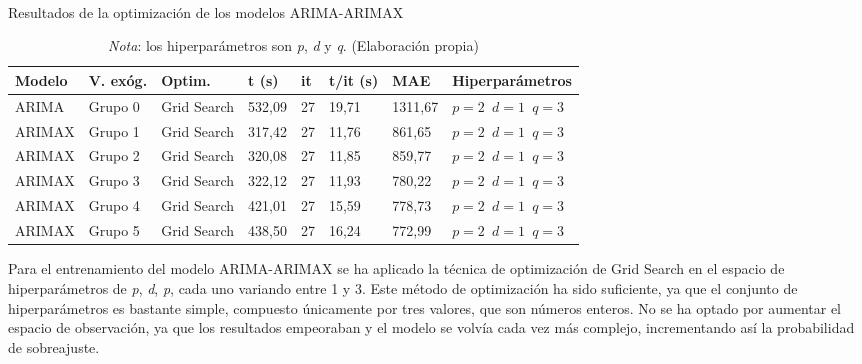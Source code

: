 \documentclass[12pt,a4paper]{report}
\begin{document}
\begin{table}[H]
\centering
\caption{\\ Resultados de la optimización de los modelos ARIMA-ARIMAX}
\scriptsize
\begin{tabular}{m{1cm} m{1.2cm} m{1.2cm} m{1cm} m{1cm} m{1.2cm} m{1.2cm} m{2cm}} 
\toprule
\textbf{Modelo} & \textbf{V. exóg.} & \textbf{Optim.} & \textbf{t (s)} & \textbf{it} & \textbf{t/it (s)} & \textbf{MAE} & \textbf{Hiperparámetros} \\
\midrule
ARIMA   & Grupo 0 & Grid Search & 532,09 & 27 & 19,71 & 1311,67 & \texttt{$p=2$ \newline $d=1$ \newline $q=3$} \\[0.5em]
\hline
ARIMAX  & Grupo 1 & Grid Search & 317,42 & 27 & 11,76 & 861,65 & \texttt{$p=2$ \newline $d=1$ \newline $q=3$} \\[0.5em]
\hline
ARIMAX  & Grupo 2 & Grid Search & 320,08 & 27 & 11,85 & 859,77 & \texttt{$p=2$ \newline $d=1$ \newline $q=3$} \\[0.5em]
\hline
ARIMAX  & Grupo 3 & Grid Search & 322,12 & 27 & 11,93 & 780,22 & \texttt{$p=2$ \newline $d=1$ \newline $q=3$} \\[0.5em]
\hline
ARIMAX  & Grupo 4 & Grid Search & 421,01 & 27 & 15,59 & 778,73 & \texttt{$p=2$ \newline $d=1$ \newline $q=3$} \\[0.5em]
\hline
ARIMAX  & Grupo 5 & Grid Search & 438,50 & 27 & 16,24 & 772,99 & \texttt{$p=2$ \newline $d=1$ \newline $q=3$} \\
\bottomrule
\end{tabular}
\label{tab:resultados_optimizacion_arima}
\caption*{\textit{Nota}:  
los hiperparámetros son \textit{p}, \textit{d} y \textit{q}. (Elaboración propia)}
\end{table}

Para el entrenamiento del modelo ARIMA-ARIMAX se ha aplicado la técnica de optimización de Grid Search en el espacio de hiperparámetros de \textit{p}, \textit{d}, \textit{p}, cada uno variando entre 1 y 3. Este método de optimización ha sido suficiente, ya que el conjunto de hiperparámetros es bastante simple, compuesto únicamente por tres valores, que son números enteros. No se ha optado por aumentar el espacio de observación, ya que los resultados empeoraban y el modelo se volvía cada vez más complejo, incrementando así la probabilidad de sobreajuste.
\end{document}
